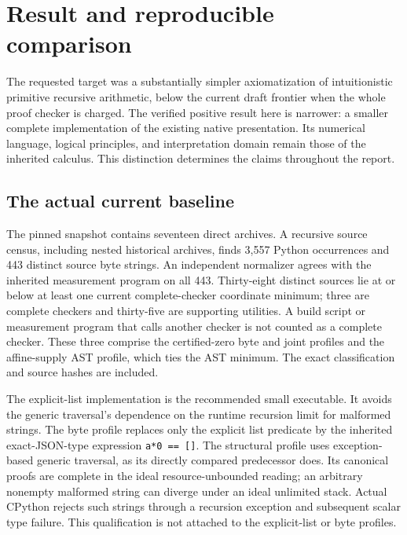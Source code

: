 \section{Result and reproducible comparison}
\label{sec:result}

The requested target was a substantially simpler axiomatization of
intuitionistic primitive recursive arithmetic, below the current draft
frontier when the whole proof checker is charged. The verified positive
result here is narrower: a smaller complete implementation of the
existing native presentation. Its numerical language, logical principles,
and interpretation domain remain those of the inherited calculus.
This distinction determines the claims throughout the report.

\subsection{The actual current baseline}

The pinned snapshot contains seventeen direct archives. A recursive
source census, including nested historical archives, finds 3,557 Python
occurrences and 443 distinct source byte strings. An independent
normalizer agrees with the inherited measurement program on all 443.
Thirty-eight distinct sources lie at or below at least one current
complete-checker coordinate minimum; three are complete checkers and
thirty-five are supporting utilities. A build script or measurement
program that calls another checker is not counted as a complete checker.
These three comprise the certified-zero byte and joint profiles and
the affine-supply AST profile, which ties the AST minimum. The exact
classification and source hashes are included.



The explicit-list implementation is the recommended small executable.
It avoids the generic traversal's dependence on the runtime recursion
limit for malformed strings. The byte profile replaces only the explicit
list predicate by the inherited exact-JSON-type expression
\texttt{a*0 == []}. The structural profile uses exception-based generic
traversal, as its directly compared predecessor does. Its canonical
proofs are complete in the ideal resource-unbounded reading; an arbitrary
nonempty malformed string can diverge under an ideal unlimited stack.
Actual CPython rejects such strings through a recursion exception and
subsequent scalar type failure. This qualification is not attached to
the explicit-list or byte profiles.

